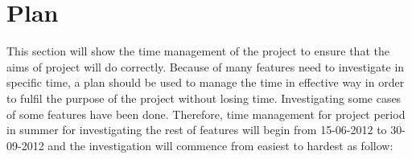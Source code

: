 \documentclass[12pt,a4paper]{report}
\begin{document}
\section{Plan}
\label{section: plan}

This section will show the time management of the project to ensure that the aims of project will do correctly.  Because of many features need to investigate in specific time, a plan should be used to manage the time in effective way in order to fulfil the purpose of the project without losing time.
\newline
Investigating some cases of some features have been done. Therefore, time management for project period in summer for investigating the rest of features will begin from 15-06-2012 to 30-09-2012 and the investigation will commence from easiest to hardest as follow:
\end{document}
